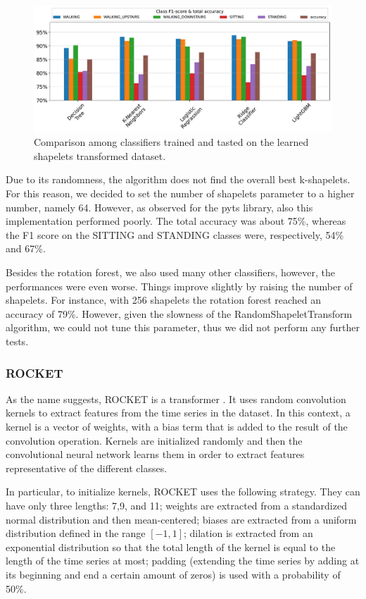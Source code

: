 \documentclass[10pt, a4paper, twocolumn]{article}
\begin{document}
\begin{figure}[t]
    \centering
    \includegraphics[width=\columnwidth]{immagini simone/output_152_0.pdf}
    \caption{Comparison among classifiers trained and tasted on the learned shapelets transformed dataset.}
    \label{fig:shapelet_classifiers}
\end{figure}

Due to its randomness, the algorithm does not find the overall best k-shapelets. For this reason, we decided to set the number of shapelets parameter to a higher number, namely 64. However, as observed for the pyts library, also this implementation performed poorly. The total accuracy was about 75\%, whereas the F1 score on the SITTING and STANDING classes were, respectively, 54\% and 67\%. 

Besides the rotation forest, we also used many other classifiers, however, the performances were even worse. Things improve slightly by raising the number of shapelets. For instance, with 256 shapelets the rotation forest reached an accuracy of 79\%. However, given the slowness of the RandomShapeletTransform algorithm, we could not tune this parameter, thus we did not perform any further tests. 

\subsubsection*{ROCKET}

As the name suggests, ROCKET is a transformer \parencite{rocket:2020}. It uses random convolution kernels to extract features from the time series in the dataset. In this context, a kernel is a vector of weights, with a bias term that is added to the result of the convolution operation. Kernels are initialized randomly and then the convolutional neural network learns them in order to extract features representative of the different classes. 
 
In particular, to initialize kernels, ROCKET uses the following strategy. They can have only three lengths: 7,9, and 11; weights are extracted from a standardized normal distribution and then mean-centered; biases are extracted from a uniform distribution defined in the range $[-1,1]$; dilation is extracted from an exponential distribution so that the total length of the kernel is equal to the length of the time series at most; padding (extending the time series by adding at its beginning and end a certain amount of zeros) is used with a probability of 50\%.  
\end{document}
